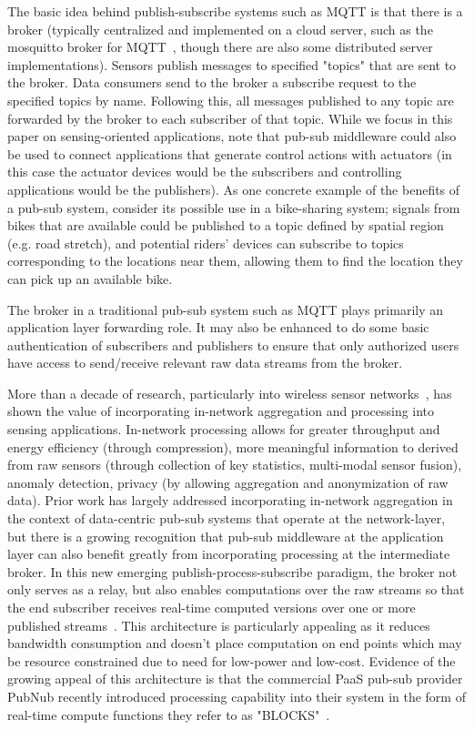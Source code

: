 The basic idea behind publish-subscribe systems such as MQTT is that there is a
broker (typically centralized and implemented on a cloud server, such as the
mosquitto broker for MQTT~\cite{light2013mosquitto}, though there are also some
distributed server implementations). Sensors publish messages to specified
"topics" that are sent to the broker. Data consumers send to the broker a
subscribe request to the specified topics by name. Following this, all messages
published to any topic are forwarded by the broker to each subscriber of that
topic. While we focus in this paper on sensing-oriented applications, note that
pub-sub middleware could also be used to connect applications that generate
control actions with actuators (in this case the actuator devices would be the
subscribers and controlling applications would be the publishers). As one
concrete example of the benefits of a pub-sub system, consider its possible use
in a bike-sharing system; signals from bikes that are available could be
published to a topic defined by spatial region (e.g. road stretch), and
potential riders' devices can subscribe to topics corresponding to the
locations near them, allowing them to find the location they can pick up an
available bike. 

The broker in a traditional pub-sub system such as MQTT plays primarily an
application layer forwarding role. It may also be enhanced to do some basic
authentication of subscribers and publishers to ensure that only authorized
users have access to send/receive relevant raw data streams from the broker. 

More than a decade of research, particularly into  wireless sensor
networks~\cite{yao2002cougar, krishnamachari2002impact}, has shown the value of
incorporating in-network aggregation and processing into sensing applications.
In-network processing allows for greater throughput and energy efficiency
(through compression), more meaningful information to derived from raw sensors
(through collection of key statistics, multi-modal sensor fusion), anomaly
detection, privacy (by allowing aggregation and anonymization of raw data).
Prior work has largely addressed incorporating in-network aggregation in the
context of data-centric pub-sub systems that operate at the network-layer, but
there is a growing recognition that pub-sub middleware at the application layer
can also benefit greatly from incorporating processing at the intermediate
broker. In this new emerging  publish-process-subscribe paradigm, the broker
not only serves as a relay, but also enables computations over the raw streams
so that the end subscriber receives real-time computed versions over one or
more published streams~\cite{kwame17}. This architecture is particularly
appealing as it reduces bandwidth consumption and doesn't place computation on
end points which may be resource constrained due to need for low-power and
low-cost. Evidence of the growing appeal of this architecture is that the
commercial PaaS pub-sub provider PubNub recently introduced processing
capability into their system in the form of real-time compute functions they
refer to as "BLOCKS"~\cite{blocks}.

